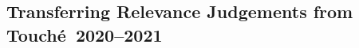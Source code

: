 


\subsection{Transferring Relevance Judgements from Touché~2020--2021}
\label{transfer-relevance-judgements}

